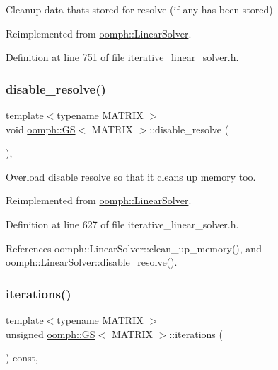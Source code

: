 Cleanup data that\textquotesingle{}s stored for resolve (if any has been stored) 



Reimplemented from \hyperlink{classoomph_1_1LinearSolver_a9d66f3262e80ca06a365f98216afd85f}{oomph\+::\+Linear\+Solver}.



Definition at line 751 of file iterative\+\_\+linear\+\_\+solver.\+h.

\mbox{\label{classoomph_1_1GS_a9c3bfbebb6686c5f3ca650ef01697728}} 
\subsubsection{\texorpdfstring{disable\+\_\+resolve()}{disable\_resolve()}}
{\footnotesize\ttfamily template$<$typename M\+A\+T\+R\+IX $>$ \\
void \hyperlink{classoomph_1_1GS}{oomph\+::\+GS}$<$ M\+A\+T\+R\+IX $>$\+::disable\+\_\+resolve (\begin{DoxyParamCaption}{ }\end{DoxyParamCaption})\hspace{0.3cm}{\ttfamily [inline]}, {\ttfamily [virtual]}}



Overload disable resolve so that it cleans up memory too. 



Reimplemented from \hyperlink{classoomph_1_1LinearSolver_ad61c63af94c5961830bd9807225a48d6}{oomph\+::\+Linear\+Solver}.



Definition at line 627 of file iterative\+\_\+linear\+\_\+solver.\+h.



References oomph\+::\+Linear\+Solver\+::clean\+\_\+up\+\_\+memory(), and oomph\+::\+Linear\+Solver\+::disable\+\_\+resolve().

\mbox{\label{classoomph_1_1GS_ad182a2d91cb9d629cb516102f9a3c649}} 
\subsubsection{\texorpdfstring{iterations()}{iterations()}}
{\footnotesize\ttfamily template$<$typename M\+A\+T\+R\+IX $>$ \\
unsigned \hyperlink{classoomph_1_1GS}{oomph\+::\+GS}$<$ M\+A\+T\+R\+IX $>$\+::iterations (\begin{DoxyParamCaption}{ }\end{DoxyParamCaption}) const\hspace{0.3cm}{\ttfamily [inline]}, {\ttfamily [virtual]}}




